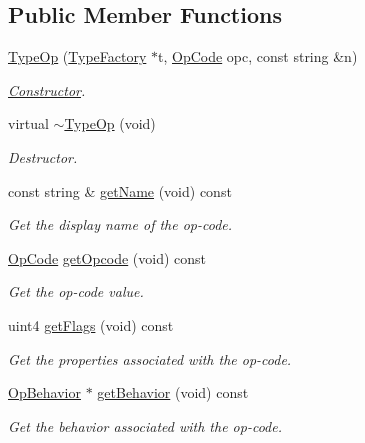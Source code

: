 \subsection*{Public Member Functions}
\begin{DoxyCompactItemize}
\item 
\mbox{\hyperlink{class_type_op_a9f6e01a5e1cc9563939cb7721799f92b}{Type\+Op}} (\mbox{\hyperlink{class_type_factory}{Type\+Factory}} $\ast$t, \mbox{\hyperlink{opcodes_8hh_abeb7dfb0e9e2b3114e240a405d046ea7}{Op\+Code}} opc, const string \&n)
\begin{DoxyCompactList}\small\item\em \mbox{\hyperlink{class_constructor}{Constructor}}. \end{DoxyCompactList}\item 
virtual \mbox{\hyperlink{class_type_op_a980865aa52454f91d61f24062545de9a}{$\sim$\+Type\+Op}} (void)
\begin{DoxyCompactList}\small\item\em Destructor. \end{DoxyCompactList}\item 
const string \& \mbox{\hyperlink{class_type_op_a66dc6a9447b6fb2482f2294ba0a2742b}{get\+Name}} (void) const
\begin{DoxyCompactList}\small\item\em Get the display name of the op-\/code. \end{DoxyCompactList}\item 
\mbox{\hyperlink{opcodes_8hh_abeb7dfb0e9e2b3114e240a405d046ea7}{Op\+Code}} \mbox{\hyperlink{class_type_op_a5517454126d174242274a1be78a07779}{get\+Opcode}} (void) const
\begin{DoxyCompactList}\small\item\em Get the op-\/code value. \end{DoxyCompactList}\item 
uint4 \mbox{\hyperlink{class_type_op_acef6af9a0ebdbfb22f258f634f810525}{get\+Flags}} (void) const
\begin{DoxyCompactList}\small\item\em Get the properties associated with the op-\/code. \end{DoxyCompactList}\item 
\mbox{\hyperlink{class_op_behavior}{Op\+Behavior}} $\ast$ \mbox{\hyperlink{class_type_op_a088cd2447161e17f6b29aa0882daac83}{get\+Behavior}} (void) const
\begin{DoxyCompactList}\small\item\em Get the behavior associated with the op-\/code. \end{DoxyCompactList}\item 

\end{DoxyCompactItemize}
